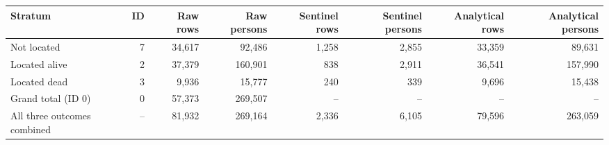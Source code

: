 \begin{tabular}{lrrrrrrr}
\toprule
Stratum & ID & Raw rows & Raw persons & Sentinel rows & Sentinel persons & Analytical rows & Analytical persons \\
\midrule
Not located & 7 & 34,617 & 92,486 & 1,258 & 2,855 & 33,359 & 89,631 \\
Located alive & 2 & 37,379 & 160,901 & 838 & 2,911 & 36,541 & 157,990 \\
Located dead & 3 & 9,936 & 15,777 & 240 & 339 & 9,696 & 15,438 \\
\midrule
Grand total (ID 0) & 0 & 57,373 & 269,507 & -- & -- & -- & -- \\
All three outcomes combined & -- & 81,932 & 269,164 & 2,336 & 6,105 & 79,596 & 263,059 \\
\bottomrule
\end{tabular}
%
